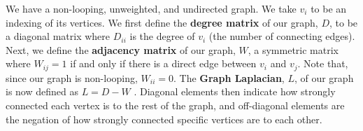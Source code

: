 We have a non-looping, unweighted, and undirected graph. We take $v_i$ to be an indexing of its vertices.
We first define the \textbf{degree matrix} of our graph, $D$, to be a diagonal matrix where $D_{ii}$ is the degree of $v_i$ (the number of connecting edges).
Next, we define the \textbf{adjacency matrix} of our graph, $W$, a symmetric matrix where $W_{ij}=1$ if and only if there is a direct edge between $v_i$ and $v_j$. Note that, since our graph is non-looping, $W_{ii}=0$.
The \textbf{Graph Laplacian}, $L$, of our graph is now defined as $L=D-W$ \cite{weisstein}. Diagonal elements then indicate how strongly connected each vertex is to the rest of the graph, and off-diagonal elements are the negation of how strongly connected specific vertices are to each other.